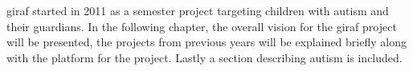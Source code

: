 \ac{giraf} started in 2011 as a semester project targeting children with autism and their guardians. %
 In the following chapter, the overall vision for the \ac{giraf} project will be presented, the projects from previous years will be explained briefly along with the platform for the project. Lastly a section describing autism is included.
